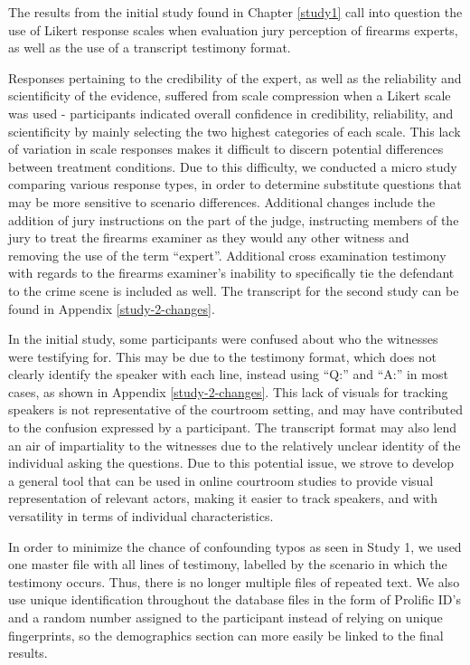\documentclass[print]{nuthesis}
\begin{document}
The results from the initial study found in Chapter \ref{study1} call into question the use of Likert response scales when evaluation jury perception of firearms experts, as well as the use of a transcript testimony format.

Responses pertaining to the credibility of the expert, as well as the reliability and scientificity of the evidence, suffered from scale compression when a Likert scale was used - participants indicated overall confidence in credibility, reliability, and scientificity by mainly selecting the two highest categories of each scale.
This lack of variation in scale responses makes it difficult to discern potential differences between treatment conditions.
Due to this difficulty, we conducted a micro study comparing various response types, in order to determine substitute questions that may be more sensitive to scenario differences.
Additional changes include the addition of jury instructions on the part of the judge, instructing members of the jury to treat the firearms examiner as they would any other witness and removing the use of the term ``expert''.
Additional cross examination testimony with regards to the firearms examiner's inability to specifically tie the defendant to the crime scene is included as well.
The transcript for the second study can be found in Appendix \ref{study-2-changes}.

In the initial study, some participants were confused about who the witnesses were testifying for.
This may be due to the testimony format, which does not clearly identify the speaker with each line, instead using ``Q:'' and ``A:'' in most cases, as shown in Appendix \ref{study-2-changes}.
This lack of visuals for tracking speakers is not representative of the courtroom setting, and may have contributed to the confusion expressed by a participant.
The transcript format may also lend an air of impartiality to the witnesses due to the relatively unclear identity of the individual asking the questions.
Due to this potential issue, we strove to develop a general tool that can be used in online courtroom studies to provide visual representation of relevant actors, making it easier to track speakers, and with versatility in terms of individual characteristics.

In order to minimize the chance of confounding typos as seen in Study 1, we used one master file with all lines of testimony, labelled by the scenario in which the testimony occurs.
Thus, there is no longer multiple files of repeated text.
We also use unique identification throughout the database files in the form of Prolific ID's and a random number assigned to the participant instead of relying on unique fingerprints, so the demographics section can more easily be linked to the final results.
\end{document}
